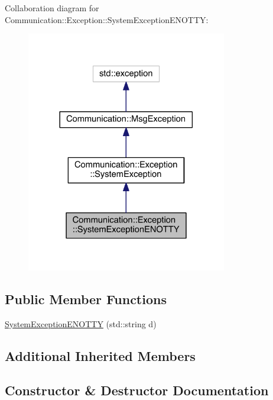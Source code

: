 Collaboration diagram for Communication\+:\+:Exception\+:\+:System\+Exception\+E\+N\+O\+T\+T\+Y\+:\nopagebreak
\begin{figure}[H]
\begin{center}
\leavevmode
\includegraphics[width=248pt]{class_communication_1_1_exception_1_1_system_exception_e_n_o_t_t_y__coll__graph}
\end{center}
\end{figure}
\subsection*{Public Member Functions}
\begin{DoxyCompactItemize}
\item 
\hyperlink{class_communication_1_1_exception_1_1_system_exception_e_n_o_t_t_y_a69e4c8c979537be2696a3293f3fe075a}{System\+Exception\+E\+N\+O\+T\+T\+Y} (std\+::string d)
\end{DoxyCompactItemize}
\subsection*{Additional Inherited Members}


\subsection{Constructor \& Destructor Documentation}
\hypertarget{class_communication_1_1_exception_1_1_system_exception_e_n_o_t_t_y_a69e4c8c979537be2696a3293f3fe075a}{}
